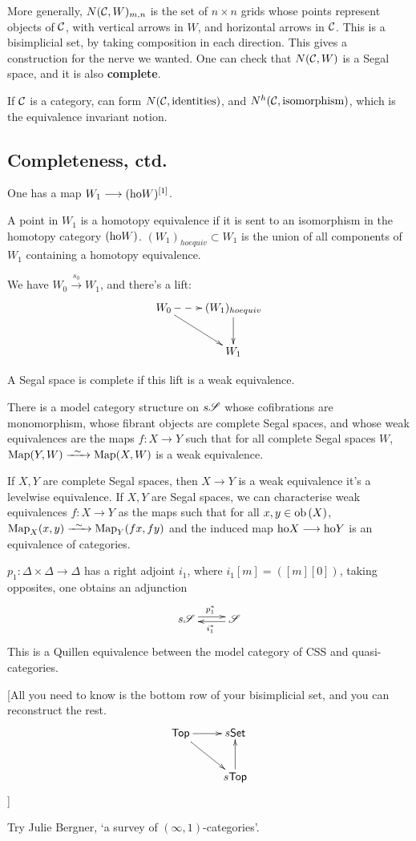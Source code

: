 \begin{GeoffroyWeakAssociativityandCompleteSegalSpaces}
More generally, $N(\mathcal{C},W)_{m,n}$ is the set of $n\times n$ grids whose points represent objects of $\mathcal{C}$, with vertical arrows in $W$, and horizontal arrows in $\mathcal{C}$. This is a bisimplicial set, by taking composition in each direction. This gives a construction for the nerve we wanted. One can check that $N(\mathcal{C},W)$ is a Segal space, and it is also \textbf{complete}.

If $\mathcal{C}$ is a category, can form $N(\mathcal{C},\textup{identities})$, and $N^h(\mathcal{C},\textup{isomorphism})$, which is the equivalence invariant notion.
\subsection*{Completeness, ctd.}

One has a map $W_1\longrightarrow(\textup{ho} W)^{[1]}$.
\begin{defn*}
A point in $W_1$ is a homotopy equivalence if it is sent to an isomorphism in the homotopy category $(\textup{ho} W)$. $(W_1)_{hoequiv}\subset W_1$  is the union of all components of $W_1$ containing a homotopy equivalence.
\end{defn*}
We have $W_0\overset{s_0}{\to} W_1$, and there's a lift:
\[\xymatrix{
W_0\ar@{-->}[r]\ar[dr]&(W_1)_{hoequiv}\ar[d]\\
&W_1
}\]
\begin{defn*}
A Segal space is complete if this lift is a weak equivalence.
\end{defn*}
\begin{thm*}[Rezk]
There is a model category structure on $s\mathscr{S}$ whose cofibrations are monomorphism, whose fibrant objects are complete Segal spaces, and whose weak equivalences are the maps $f:X\to Y$ such that for all complete Segal spaces $W$, $\Map(Y,W)\weakequiv\Map(X,W)$ is a weak equivalence.

If $X,Y$ are complete Segal spaces, then $X\to Y$ is a weak equivalence \Iff it's a levelwise equivalence. If $X,Y$ are Segal spaces, we can characterise weak equivalences $f:X\to Y$ as the maps such that for all $x,y\in\textup{ob}\,(X)$, $\Map_X(x,y)\weakequiv\Map_Y(fx,fy)$ and the induced map $\textup{ho} X\longrightarrow\textup{ho} Y$ is an equivalence of categories.
\end{thm*}
\begin{thm*}
$p_1:\Delta\times\Delta\to\Delta$ has a right adjoint $i_1$, where $i_1[m]=([m][0])$, taking opposites, one obtains an adjunction
\[\xymatrix@R=.3cm{
s\scrS  \ar@<.6ex>[r]^{p_1^*}&
\scrS \ar@<.4ex>[l]^{i_1^*}
}\]
This is a Quillen equivalence between the model category of CSS and quasi-categories.
\end{thm*}

[All you need to know is the bottom row of your bisimplicial set, and you can reconstruct the rest.\[\xymatrix{
\mathsf{Top}\ar[r]\ar[dr]&s\mathsf{Set}\ar[d];[]\\
&s\mathsf{Top}
}\]
]

Try Julie Bergner, `a survey of $(\infty,1)$-categories'.

\pagebreak
\end{GeoffroyWeakAssociativityandCompleteSegalSpaces}

